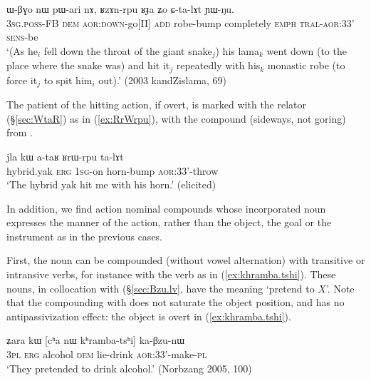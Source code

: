 \begin{exe}
\ex \label{ex:RzAnrpu}
 \gll ɯ-βɣo nɯ pɯ-ari nɤ, ʁzɤn-rpu ʁɟa ʑo ɕ-ta-lɤt ɲɯ-ŋu. \\
 \textsc{3sg}.\textsc{poss}-FB \textsc{dem} \textsc{aor}:\textsc{down}-go[II] \textsc{add} robe-bump completely \textsc{emph} \textsc{tral}-\textsc{aor}:3\fl{}3' \textsc{sens}-be \\
\glt `(As he$_i$ fell down the throat of the giant snake$_j$) his lama$_k$ went down (to the place where the snake was) and hit it$_j$ repeatedly with his$_k$  monastic robe (to force it$_j$ to spit him$_i$ out).' (2003 kandZislama, 69)
\end{exe}

The patient of the hitting action, if overt, is marked with the relator   (§\ref{sec:WtaR}) as in (\ref{ex:RrWrpu}), with the compound  (sideways, not goring) from .

\begin{exe}
\ex \label{ex:RrWrpu}
 \gll jla kɯ a-taʁ ʁrɯ-rpu ta-lɤt \\
 hybrid.yak \textsc{erg} \textsc{1sg}-on  horn-bump \textsc{aor}:3\fl{}3'-throw \\
 \glt `The hybrid yak hit me with his horn.' (elicited)
\end{exe}
 
In addition, we find action nominal compounds whose incorporated noun expresses the manner of the action, rather than the object, the goal or the instrument as in the previous cases. 

First, the noun  can be compounded (without vowel alternation) with transitive or intransive verbs, for instance with the verb  as  in (\ref{ex:khramba.tshi}). These nouns, in collocation with  (§\ref{sec:Bzu.lv}, have the meaning `pretend to $X$'. Note that the compounding with  does not saturate the object position, and has no antipassivization effect: the object  is overt in (\ref{ex:khramba.tshi}).

\begin{exe}
\ex \label{ex:khramba.tshi}
\gll ʑara kɯ [cʰa nɯ kʰramba-tsʰi] ka-βzu-nɯ \\
\textsc{3pl} \textsc{erg} alcohol \textsc{dem} lie-drink \textsc{aor}:3\fl{}3'-make-\textsc{pl} \\
\glt `They pretended to drink alcohol.' (Norbzang 2005, 100)
\end{exe}

